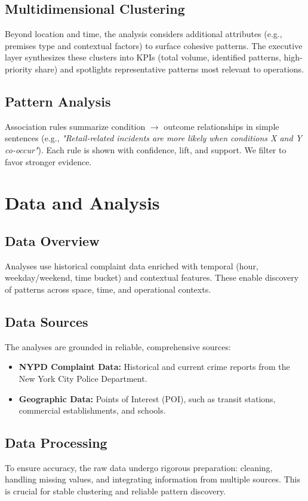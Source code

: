 \documentclass[11pt]{article}
\begin{document}
\subsection{Multidimensional Clustering}
Beyond location and time, the analysis considers additional attributes (e.g., premises type and contextual factors) to surface cohesive patterns. The executive layer synthesizes these clusters into KPIs (total volume, identified patterns, high-priority share) and spotlights representative patterns most relevant to operations.

\subsection{Pattern Analysis}
Association rules summarize condition $\rightarrow$ outcome relationships in simple sentences (e.g., \emph{"Retail-related incidents are more likely when conditions X and Y co-occur"}). Each rule is shown with confidence, lift, and support. We filter to favor stronger evidence.

\section{Data and Analysis}

\subsection{Data Overview}
Analyses use historical complaint data enriched with temporal (hour, weekday/weekend, time bucket) and contextual features. These enable discovery of patterns across space, time, and operational contexts.

\subsection{Data Sources}
The analyses are grounded in reliable, comprehensive sources:
\begin{itemize}[leftmargin=*]
  \item \textbf{NYPD Complaint Data:} Historical and current crime reports from the New York City Police Department.
  \item \textbf{Geographic Data:} Points of Interest (POI), such as transit stations, commercial establishments, and schools.
\end{itemize}

\subsection{Data Processing}
To ensure accuracy, the raw data undergo rigorous preparation: cleaning, handling missing values, and integrating information from multiple sources. This is crucial for stable clustering and reliable pattern discovery.
\end{document}
